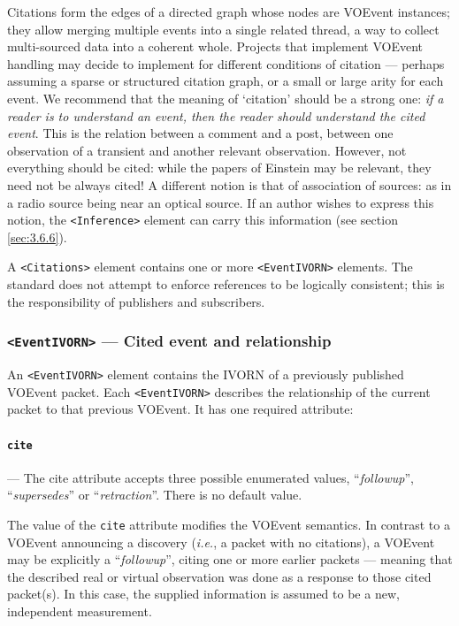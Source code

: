 \documentclass[11pt,a4paper]{ivoa}
\begin{document}
Citations form the edges of a directed graph whose nodes are VOEvent instances; they allow merging multiple events into a single related thread, a way to collect multi-sourced data into a coherent whole. Projects that implement VOEvent handling may decide to implement for different conditions of citation --- perhaps assuming a sparse or structured citation graph, or a small or large arity for each event. We recommend that the meaning of `citation' should be a strong one: \emph{if a reader is to understand an event, then the reader should understand the cited event}. This is the relation between a comment and a post, between one observation of a transient and another relevant observation. However, not everything should be cited: while the papers of Einstein may be relevant, they need not be always cited! A different notion is that of association of sources: as in a radio source being near an optical source. If an author wishes to express this notion, the {\tt <Inference>} element can carry this information (see section \ref{sec:3.6.6}). 

A {\tt <Citations>} element contains one or more {\tt <EventIVORN>} elements. The standard does not attempt to enforce references to be logically consistent; this is the responsibility of publishers and subscribers. 

\subsubsection{{\tt <EventIVORN>} --- Cited event and relationship}
\label{sec:3.7.1}
An {\tt <EventIVORN>} element contains the IVORN of a previously published VOEvent packet. Each {\tt <EventIVORN>} describes the relationship of the current packet to that previous VOEvent. It has one required attribute: 

\paragraph{\tt cite}\label{sec:3.7.1.1} --- The {cite} attribute accepts three possible enumerated values, ``\emph{followup}'', ``\emph{supersedes}'' or ``\emph{retraction}''. There is no default value. 

The value of the {\tt cite} attribute modifies the VOEvent semantics. In contrast to a VOEvent announcing a discovery (\emph{i.e.}, a packet with no citations), a VOEvent may be explicitly a ``\emph{followup}'', citing one or more earlier packets --- meaning that the described real or virtual observation was done as a response to those cited packet(s). In this case, the supplied information is assumed to be a new, independent measurement. 
\end{document}
